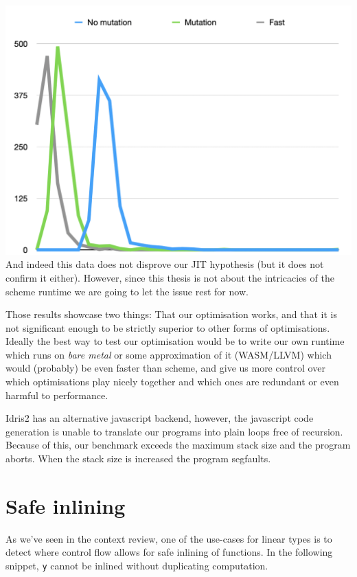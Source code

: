 \documentclass[
]{article}
\begin{document}
\includegraphics{Screenshot 2020-08-25 at 17.59.21.png} And indeed this
data does not disprove our JIT hypothesis (but it does not confirm it
either). However, since this thesis is not about the intricacies of the
scheme runtime we are going to let the issue rest for now.

Those results showcase two things: That our optimisation works, and that
it is not significant enough to be strictly superior to other forms of
optimisations. Ideally the best way to test our optimisation would be to
write our own runtime which runs on \emph{bare metal} or some
approximation of it (WASM/LLVM) which would (probably) be even faster
than scheme, and give us more control over which optimisations play
nicely together and which ones are redundant or even harmful to
performance.

Idris2 has an alternative javascript backend, however, the javascript
code generation is unable to translate our programs into plain loops
free of recursion. Because of this, our benchmark exceeds the maximum
stack size and the program aborts. When the stack size is increased the
program segfaults.

\hypertarget{safe-inlining}{%
\section{Safe inlining}\label{safe-inlining}}

As we've seen in the context review, one of the use-cases for linear
types is to detect where control flow allows for safe inlining of
functions. In the following snippet, \texttt{y} cannot be inlined
without duplicating computation.
\end{document}
